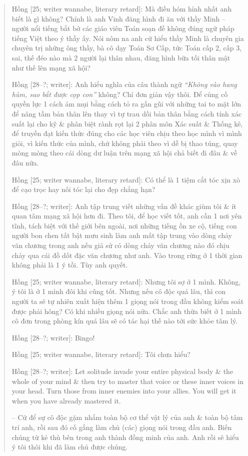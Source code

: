 \documentclass[12pt,oneside]{book}
\begin{document}
\begin{quote}
	{\sf Hồng [25; writer wannabe, literary retard]}: Mà điều hóm hỉnh nhất anh biết là gì không? Chính là anh Vinh đăng hình đi ăn với thầy Minh -- người nổi tiếng bắt bớ các giáo viên Toán soạn đề không đúng ngữ pháp tiếng Việt theo ý thầy ấy. Nói nôm na anh cứ hiểu thầy Minh là chuyên gia chuyên trị những ông thầy, bà cô dạy Toán Sơ Cấp, tức Toán cấp 2, cấp 3, sai, thế đéo nào mà 2 người lại thân nhau, đăng hình bữa tối thân mật như thế lên mạng xã hội?
	
	{\sf Hồng [28--?; writer]}: Anh hiểu nghĩa của câu thành ngữ {\it ``Không vào hang hùm, sao bắt được cọp con''} không? Chỉ đơn giản vậy thôi. Để củng cố quyền lực 1 cách ám mụi bằng cách tỏ ra gần gũi với những tai to mặt lớn để nâng tầm bản thân lên thay vì tự trau dồi bản thân bằng cách tính xác suất lại cho kỹ \& phân biệt rành rọt lại 2 phân môn Xác suất \& Thống kê, để truyền đạt kiến thức đúng cho các học viên chịu theo học mình vì mình giỏi, vì kiến thức của mình, chứ không phải theo vì dễ bị thao túng, quay mòng mòng theo cái dòng dư luận trên mạng xã hội chả biết đi đâu \& về đâu nữa.
	
	{\sf Hồng [25; writer wannabe, literary retard]}: Có thể là 1 tiệm cắt tóc xịn xò để cạo trọc hay nối tóc lại cho đẹp chẳng hạn?
	
	{\sf Hồng [28--?; writer]}: Anh tập trung viết những vấn đề khác giùm tôi \& ít quan tâm mạng xã hội hơn đi. Theo tôi, để học viết tốt, anh cần 1 nơi yên tĩnh, tách biệt với thế giới bên ngoài, nơi những tiếng ồn xe cộ, tiếng con người bon chen tất bật mưu sinh làm anh mất tập trung vào dòng chảy văn chương trong anh nếu giả sử có dòng chảy văn chương nào đó chịu chảy qua cái đồ dốt đặc văn chương như anh. Vào trong rừng ở 1 thời gian không phải là 1 ý tồi. Tùy anh quyết.
	
	{\sf Hồng [25; writer wannabe, literary retard]}: Nhưng tôi sợ ở 1 mình. Không, ý tôi là ở 1 mình đôi khi cũng tốt. Nhưng nếu cô độc quá lâu, thì con người ta sẽ tự nhiên xuất hiện thêm 1 giọng nói trong đầu không kiểm soát được phải hông? Có khi nhiều giọng nói nữa. Chắc anh thừa biết ở 1 mình cô đơn trong phòng kín quá lâu sẽ có tác hại thế nào tới sức khỏe tâm lý.
	
	{\sf Hồng [28--?; writer]}: Bingo!
	
	{\sf Hồng [25; writer wannabe, literary retard]}: Tôi chưa hiểu?
	
	{\sf Hồng [28--?; writer]}: Let solitude invade your entire physical body \& the whole of your mind \& then try to master that voice or these inner voices in your head. Turn those from inner enemies into your allies. You will get it when you have already mastered it.
	
	-- Cứ để sự cô độc gặm nhắm toàn bộ cơ thể vật lý của anh \& toàn bộ tâm trí anh, rồi sau đó cố gắng làm chủ (các) giọng nói trong đầu anh. Biến chúng từ kẻ thù bên trong anh thành đồng minh của anh. Anh rồi sẽ hiểu ý tôi thôi khi đã làm chủ được chúng.
\end{quote}
\end{document}
